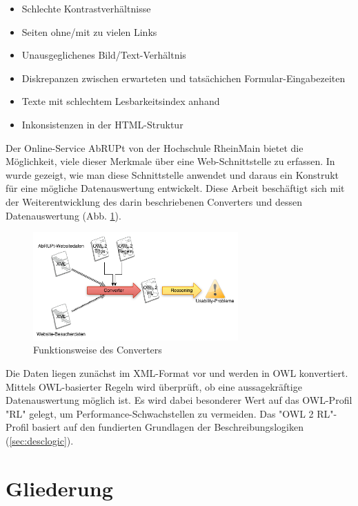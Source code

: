 \documentclass[runningheads,a4paper]{llncs}
\begin{document}
\begin{itemize}

    \item{Schlechte Kontrastverhältnisse}
    \item{Seiten ohne/mit zu vielen Links}
    \item{Unausgeglichenes Bild/Text-Verhältnis}
    \item{Diskrepanzen zwischen erwarteten und tatsächichen Formular-Eingabezeiten}
    \item{Texte mit schlechtem Lesbarkeitsindex anhand \cite{lesbarkeit}}
    \item{Inkonsistenzen in der HTML-Struktur}
    
\end{itemize}

Der Online-Service AbRUPt \cite{abrupt} von der Hochschule RheinMain bietet die Möglichkeit, viele dieser Merkmale über eine Web-Schnittstelle zu erfassen. 
In \cite{Brieger} wurde gezeigt, wie man diese Schnittstelle anwendet und daraus ein Konstrukt für eine mögliche Datenauswertung entwickelt.
Diese Arbeit beschäftigt sich mit der Weiterentwicklung des darin beschriebenen Converters und dessen Datenauswertung (Abb. \ref{fig:converter}).

\begin{figure}
\centering
\includegraphics[width=0.7\textwidth]{figures/converter}
\caption{Funktionsweise des Converters}
\label{fig:converter}
\end{figure}

Die Daten liegen zunächst im XML-Format vor und werden in OWL konvertiert.
Mittels OWL-basierter Regeln wird überprüft, ob eine aussagekräftige Datenauswertung möglich ist.
Es wird dabei besonderer Wert auf das OWL-Profil "{}RL"{} gelegt, um Performance-Schwachstellen zu vermeiden.
Das "{}OWL 2 RL"{}-Profil basiert auf den fundierten Grundlagen der Beschreibungslogiken (\ref{sec:desclogic}).

\section{Gliederung}
\label{sec:structure}
\end{document}
